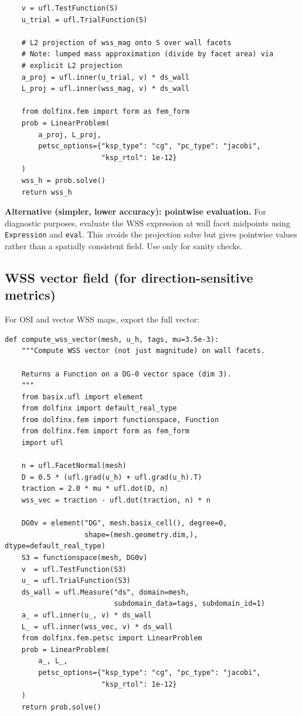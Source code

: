 \documentclass[11pt]{article}
\begin{document}
\begin{lstlisting}
    v = ufl.TestFunction(S)
    u_trial = ufl.TrialFunction(S)

    # L2 projection of wss_mag onto S over wall facets
    # Note: lumped mass approximation (divide by facet area) via
    # explicit L2 projection
    a_proj = ufl.inner(u_trial, v) * ds_wall
    L_proj = ufl.inner(wss_mag, v) * ds_wall

    from dolfinx.fem import form as fem_form
    prob = LinearProblem(
        a_proj, L_proj,
        petsc_options={"ksp_type": "cg", "pc_type": "jacobi",
                       "ksp_rtol": 1e-12}
    )
    wss_h = prob.solve()
    return wss_h
\end{lstlisting}

\textbf{Alternative (simpler, lower accuracy): pointwise evaluation.}
For diagnostic purposes, evaluate the WSS expression at wall facet
midpoints using \texttt{Expression} and \texttt{eval}. This avoids the
projection solve but gives pointwise values rather than a spatially
consistent field. Use only for sanity checks.

\subsection*{WSS vector field (for direction-sensitive metrics)}

For OSI and vector WSS maps, export the full vector:

\begin{lstlisting}
def compute_wss_vector(mesh, u_h, tags, mu=3.5e-3):
    """Compute WSS vector (not just magnitude) on wall facets.

    Returns a Function on a DG-0 vector space (dim 3).
    """
    from basix.ufl import element
    from dolfinx import default_real_type
    from dolfinx.fem import functionspace, Function
    from dolfinx.fem import form as fem_form
    import ufl

    n = ufl.FacetNormal(mesh)
    D = 0.5 * (ufl.grad(u_h) + ufl.grad(u_h).T)
    traction = 2.0 * mu * ufl.dot(D, n)
    wss_vec = traction - ufl.dot(traction, n) * n

    DG0v = element("DG", mesh.basix_cell(), degree=0,
                   shape=(mesh.geometry.dim,), dtype=default_real_type)
    S3 = functionspace(mesh, DG0v)
    v  = ufl.TestFunction(S3)
    u_ = ufl.TrialFunction(S3)
    ds_wall = ufl.Measure("ds", domain=mesh,
                          subdomain_data=tags, subdomain_id=1)
    a_ = ufl.inner(u_, v) * ds_wall
    L_ = ufl.inner(wss_vec, v) * ds_wall
    from dolfinx.fem.petsc import LinearProblem
    prob = LinearProblem(
        a_, L_,
        petsc_options={"ksp_type": "cg", "pc_type": "jacobi",
                       "ksp_rtol": 1e-12}
    )
    return prob.solve()
\end{lstlisting}
\end{document}
